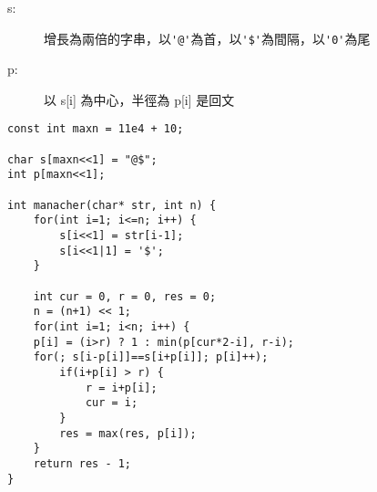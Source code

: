 \begin{description}
    \item [s:] 增長為兩倍的字串，以\verb|'@'|為首，以\verb|'$'|為間隔，以\verb|'0'|為尾
    \item [p:] 以 s[i] 為中心，半徑為 p[i] 是回文
\end{description}

\begin{lstlisting}
const int maxn = 11e4 + 10;

char s[maxn<<1] = "@$";
int p[maxn<<1];

int manacher(char* str, int n) {
    for(int i=1; i<=n; i++) {
        s[i<<1] = str[i-1];
        s[i<<1|1] = '$';
    }

    int cur = 0, r = 0, res = 0;
    n = (n+1) << 1;
    for(int i=1; i<n; i++) {
    p[i] = (i>r) ? 1 : min(p[cur*2-i], r-i);
    for(; s[i-p[i]]==s[i+p[i]]; p[i]++);
        if(i+p[i] > r) {
            r = i+p[i];
            cur = i;
        }
        res = max(res, p[i]);
    }
    return res - 1;
}
\end{lstlisting}